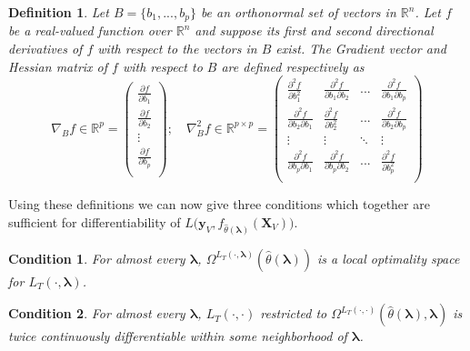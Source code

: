 \documentclass[10pt,letterpaper]{article}
\newtheorem{definition}{Definition}
\newtheorem{condition}{Condition}
\begin{document}
\begin{definition}
Let $B = \{ b_1, ..., b_p \}$ be an orthonormal set of vectors in $\mathbb{R}^n$. Let $f$ be a real-valued function over $\mathbb{R}^n$ and suppose its first and second directional derivatives of $f$ with respect to the vectors in $B$ exist. The Gradient vector and Hessian matrix of $f$ with respect to $B$ are defined respectively as
\begin{equation}\label{eq:hess}
\nabla_B f \in \mathbb{R}^{p} =
\left (
\begin{array}{c}
\frac{\partial f}{\partial b_1} \\
\frac{\partial f}{\partial b_2} \\
\vdots\\
\frac{\partial f}{\partial b_p}\\
\end{array}
\right );
\quad
\nabla^2_B f \in \mathbb{R}^{p\times p} =
\left (
\begin{array}{cccc}
\frac{\partial^2 f}{\partial b_1^2} & \frac{\partial^2 f}{\partial b_1 \partial b_2} & ...  & \frac{\partial^2 f}{\partial b_1 \partial b_p} \\
\frac{\partial^2 f}{\partial b_2 \partial b_1} & \frac{\partial^2 f}{\partial b_2^2} & ...  & \frac{\partial^2 f}{\partial b_2 \partial b_p} \\
\vdots & \vdots &  \ddots & \vdots \\
\frac{\partial^2 f}{\partial b_p \partial b_1} & \frac{\partial^2 f}{\partial b_p \partial b_2} & ...  & \frac{\partial^2 f}{\partial b_p^2} \\
\end{array}
\right )
\end{equation}
\end{definition}

Using these definitions we can now give three conditions which together are sufficient for differentiability of $L \Big( \boldsymbol{y}_V, f_{\hat{\theta}(\boldsymbol{\lambda})}(\boldsymbol{X}_V) \Big )$.

\begin{condition}
For almost every $\boldsymbol{\lambda}$, $\Omega^{L_T(\cdot, \boldsymbol{\lambda})}(\hat{\theta}\left(\boldsymbol{\lambda}\right))$ is a local optimality space for $L_T\left(\cdot,\boldsymbol{\lambda}\right)$.
\end{condition}

\begin{condition}
For almost every $\boldsymbol{\lambda}$, $L_T\left(\cdot, \cdot\right)$ restricted to $\Omega^{L_T(\cdot, \cdot)}(\hat{\theta}\left(\boldsymbol{\lambda}\right), \boldsymbol{\lambda})$ is twice continuously differentiable within some neighborhood of $\boldsymbol{\lambda}$.
\end{condition}
\end{document}
